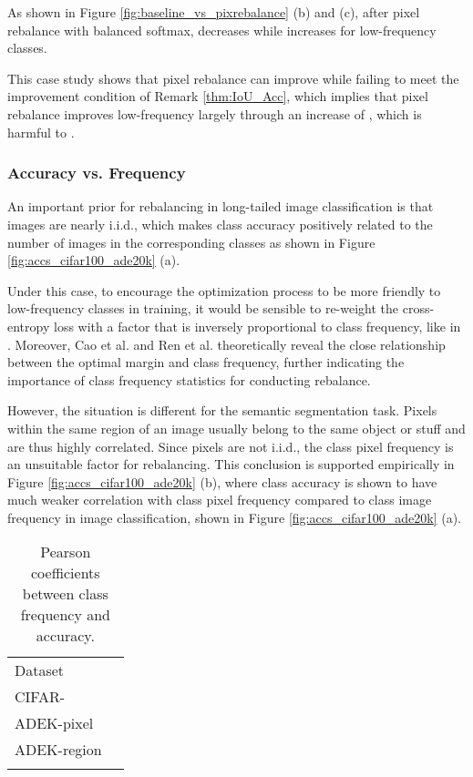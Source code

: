 \documentclass[final]{cvpr}
\begin{document}
As shown in Figure \ref{fig:baseline_vs_pixrebalance} (b) and (c), after pixel rebalance with balanced softmax,  decreases while  increases for low-frequency classes. 

This case study shows that pixel rebalance can improve  while failing to meet the  improvement condition of Remark \ref{thm:IoU_Acc}, which implies that pixel rebalance improves low-frequency  largely through an increase of , which is harmful to .


\subsubsection{Accuracy vs. Frequency}
\label{sec:challenge2}
An important prior for rebalancing in long-tailed image classification is that images are nearly i.i.d., which makes class accuracy positively related to the number of images in the corresponding classes as shown in Figure \ref{fig:accs_cifar100_ade20k} (a). 

Under this case, to encourage the optimization process to be more friendly to low-frequency classes in training, it would be sensible to re-weight the cross-entropy loss with a factor that is inversely proportional to class frequency, like in \cite{cb-focal}. Moreover, Cao et al. \cite{cao2019learning} and Ren et al. \cite{DBLP:conf/nips/RenYSMZYL20} theoretically reveal the close relationship between the optimal margin and class frequency, further indicating the importance of class frequency statistics for conducting rebalance.


However, the situation is different for the semantic segmentation task. Pixels within the same region of an image usually belong to the same object or stuff and are thus highly correlated. Since pixels are not i.i.d., the class pixel frequency is an unsuitable factor for rebalancing. This conclusion is supported empirically in Figure \ref{fig:accs_cifar100_ade20k} (b), where class accuracy is shown to have much weaker correlation with class pixel frequency compared to class image frequency in image classification, shown in Figure \ref{fig:accs_cifar100_ade20k} (a).


\begin{table}[t]
	\centering
	\setlength{\tabcolsep}{26pt}
	\caption{Pearson coefficients between class frequency and accuracy.}
	\label{tab:pearson_coefficient}
	{
		\begin{tabular}{l|c}
			\shline
			Dataset & \\
			\shline
			CIFAR-       &  \\
			ADEK-pixel    &  \\
			ADEK-region   &  \\
			\shline
		\end{tabular}
	}
	\vspace{-0.1in}
\end{table}
\end{document}
